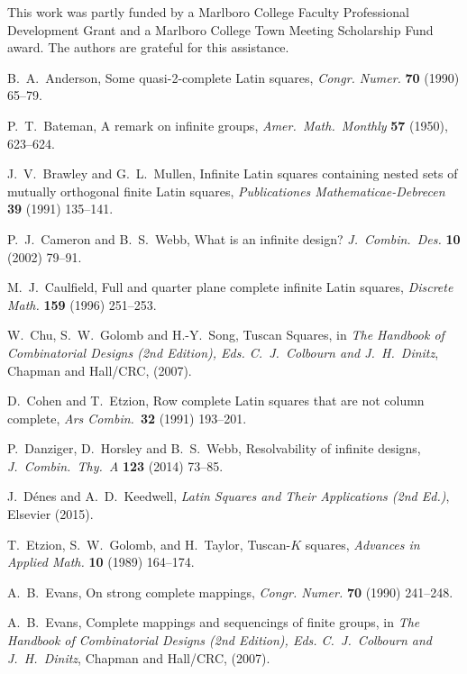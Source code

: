\documentclass[12pt,a4paper]{article}
\begin{document}
This work was partly funded by a Marlboro College Faculty Professional Development Grant and a Marlboro College Town Meeting Scholarship Fund award.  The authors are grateful for this assistance.


\begin{thebibliography}{99}


B.~A.~Anderson, Some quasi-2-complete Latin squares, {\em Congr. Numer.} {\bf 70} (1990) 65--79.

P.~T.~Bateman, A remark on infinite groups, {\em Amer.~Math.~Monthly} {\bf 57} (1950), 623--624.

J.~V.~Brawley and G.~L.~Mullen, Infinite Latin squares containing nested sets of mutually orthogonal finite Latin squares, {\em Publicationes Mathematicae-Debrecen} {\bf 39} (1991) 135--141.


P.~J.~Cameron and B.~S.~Webb, What is an infinite design? {\em J.~Combin.~Des.} {\bf 10} (2002) 79--91.

M.~J.~Caulfield, Full and quarter plane complete infinite Latin squares, {\em Discrete Math.} {\bf 159} (1996) 251--253.

W.~Chu, S.~W.~Golomb and H.-Y.~Song, Tuscan Squares, in {\em The Handbook of Combinatorial Designs (2nd Edition), Eds. C.~J.~Colbourn and J.~H.~Dinitz}, Chapman and Hall/CRC, (2007).

D.~Cohen and T.~Etzion, Row complete Latin squares that are not column complete, {\em Ars Combin.}~{\bf 32} (1991) 193--201.

P.~Danziger, D.~Horsley and B.~S.~Webb, Resolvability of infinite designs, {\em J.~Combin.~Thy.~A} {\bf 123} (2014) 73--85.

J.~D{\'e}nes and A.~D.~Keedwell, {\em Latin Squares and Their Applications (2nd Ed.)}, Elsevier (2015).

T.~Etzion, S.~W.~Golomb, and H.~Taylor, Tuscan-$K$ squares, {\em Advances in Applied Math.} {\bf 10} (1989) 164--174.


A.~B.~Evans, On strong complete mappings, {\em Congr. Numer.} {\bf 70} (1990) 241--248.


A.~B.~Evans, 
Complete mappings and sequencings of finite groups, in {\em The Handbook of Combinatorial Designs (2nd Edition), Eds. C.~J.~Colbourn and J.~H.~Dinitz}, Chapman and Hall/CRC, (2007).


\end{thebibliography}
\end{document}
